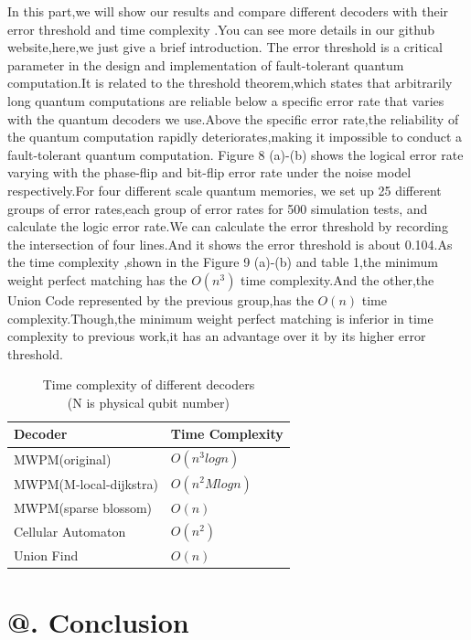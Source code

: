\documentclass[
	a4paper, %
	10pt, %
	unnumberedsections, %
	twoside, %
]{LTJournalArticle}
\makeatletter
\newcommand{\Rmnum}[1]{\expandafter\@slowromancap\romannumeral #1@}
\makeatother
\begin{document}
	In this part,we will show our results and compare different decoders with their error threshold and time complexity .You can see more details in our github website,here,we just give a brief introduction.
	The error threshold is a critical parameter in the design and implementation of fault-tolerant quantum computation.It is related to the threshold theorem,which states that arbitrarily long quantum computations are reliable below a specific error rate that varies with the quantum decoders we use.Above the specific error rate,the reliability of the quantum computation rapidly deteriorates,making it impossible to conduct a fault-tolerant quantum computation.
	Figure 8 (a)-(b) shows the logical error rate varying with the phase-flip and bit-flip error rate under the noise model respectively.For four different scale quantum memories, we set up 25 different groups of error rates,each group of error rates for 500 simulation tests, and calculate the logic error rate.We can calculate the error threshold by recording the intersection of four lines.And it shows the error threshold is about 0.104.As the time complexity ,shown in the Figure 9 (a)-(b) and table 1,the minimum weight perfect matching has the $O(n^3)$ time complexity.And the other,the Union Code represented by the previous group,has the $O(n)$ time complexity.Though,the minimum weight perfect matching is inferior in time complexity to previous work,it has an advantage over it by its higher error threshold.
\begin{table}[h]
    \caption{Time complexity of different decoders\\(N is physical qubit number)}
    \centering
    \begin{adjustbox}{max width=\columnwidth}
    \begin{tabular}{>{\raggedright\arraybackslash}p{} >{\raggedright\arraybackslash}p{}}
        \toprule
        Decoder & Time Complexity \\
        \midrule
        MWPM(original) & $O(n^3logn)$ \\
        MWPM(M-local-dijkstra) & $O(n^2Mlogn)$ \\
        MWPM(sparse blossom) & $O(n)$ \\
        Cellular Automaton & $O(n^2)$ \\
        Union Find & $O(n)$ \\
        \bottomrule
    \end{tabular}
    \end{adjustbox}
\end{table}

\section{\Rmnum{6}. Conclusion}



\end{document}
